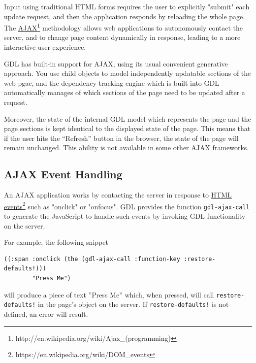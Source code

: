\documentclass [11pt]{book}
\begin{document}
Input using traditional HTML forms requires the user to explicitly "submit" each update
request, and then the application responds by reloading the whole page.  The \href{http://en.wikipedia.org/wiki/Ajax\_(programming)}{AJAX}\footnote{http://en.wikipedia.org/wiki/Ajax\_(programming)} methodology allows web
applications to autonomously contact the server, and to change page content dynamically in
response, leading to a more interactive user experience.



GDL has built-in support for AJAX, using its usual convenient generative approach.
You use child objects to model independently updatable sections of the web pgae, and the dependency
tracking engine which is built into GDL automatically manages of which sections of the
page need to be updated after a request.



Moreover, the state of the internal GDL model which
represents the page and the page sections is kept identical to the
displayed state of the page. This means that if the user hits the
``Refresh'' button in the browser, the state of the page will remain
unchanged. This ability is not available in some other AJAX
frameworks.



\subsection{AJAX Event Handling}

\label{subsec:ajaxeventhandling}



An AJAX application works by contacting the server
in response to \href{https://en.wikipedia.org/wiki/DOM\_events}{HTML events}\footnote{https://en.wikipedia.org/wiki/DOM\_events} such as "onclick"
or "onfocus".  GDL provides the function \texttt{gdl-ajax-call} to generate
the JavaScript to handle such events by invoking GDL functionality on the server.



For example, the following snippet

\begin{verbatim}((:span :onclick (the (gdl-ajax-call :function-key :restore-defaults!)))
        "Press Me")
\end{verbatim}will produce a piece of text ''Press Me'' which, when pressed, will call \texttt{restore-defaults!}
in the page's object on the server. If \texttt{restore-defaults!} is not defined, an error will result.
\end{document}
